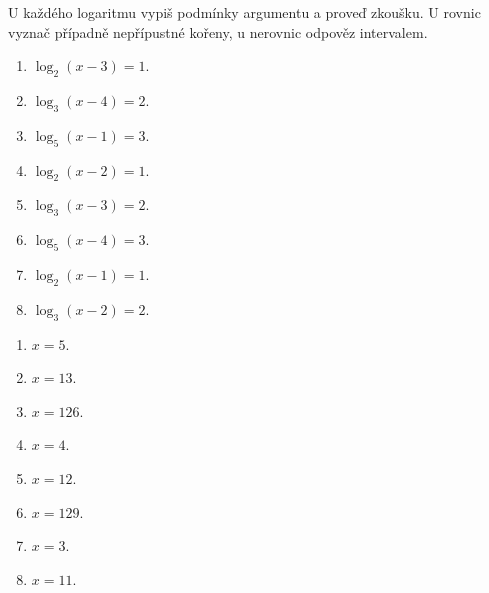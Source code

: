 \documentclass[11pt,a4paper]{article}
\begin{document}
U každého logaritmu vypiš podmínky argumentu a proveď zkoušku. U rovnic vyznač případně nepřípustné kořeny, u nerovnic odpověz intervalem.
\begin{zadaniReseniBox}[title={Domácí úkol}]
\begin{enumerate}[label=\alph*)]
\item $\log_{2}(x-3)=1$.
\item $\log_{3}(x-4)=2$.
\item $\log_{5}(x-1)=3$.
\item $\log_{2}(x-2)=1$.
\item $\log_{3}(x-3)=2$.
\item $\log_{5}(x-4)=3$.
\item $\log_{2}(x-1)=1$.
\item $\log_{3}(x-2)=2$.
\end{enumerate}
\tcblower
\begin{enumerate}[label=\alph*)]
\item $x=5$.
\item $x=13$.
\item $x=126$.
\item $x=4$.
\item $x=12$.
\item $x=129$.
\item $x=3$.
\item $x=11$.
\end{enumerate}
\end{zadaniReseniBox}
\end{document}
